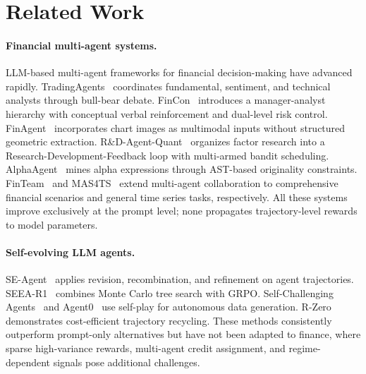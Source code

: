 \section{Related Work}
\label{sec:related}

\paragraph{Financial multi-agent systems.}
LLM-based multi-agent frameworks for financial decision-making have advanced rapidly. TradingAgents~\cite{tradingagents2025} coordinates fundamental, sentiment, and technical analysts through bull-bear debate. FinCon~\cite{fincon2024} introduces a manager-analyst hierarchy with conceptual verbal reinforcement and dual-level risk control. FinAgent~\cite{finagent2024} incorporates chart images as multimodal inputs without structured geometric extraction. R\&D-Agent-Quant~\cite{rdagent2025} organizes factor research into a Research-Development-Feedback loop with multi-armed bandit scheduling. AlphaAgent~\cite{alphaagent2025} mines alpha expressions through AST-based originality constraints. FinTeam~\cite{finteam2025} and MAS4TS~\cite{mas4ts2025} extend multi-agent collaboration to comprehensive financial scenarios and general time series tasks, respectively. All these systems improve exclusively at the prompt level; none propagates trajectory-level rewards to model parameters.

\paragraph{Self-evolving LLM agents.}
SE-Agent~\cite{seagent2025} applies revision, recombination, and refinement on agent trajectories. SEEA-R1~\cite{seea2025} combines Monte Carlo tree search with GRPO. Self-Challenging Agents~\cite{selfchallenge2025} and Agent0~\cite{agent02026} use self-play for autonomous data generation. R-Zero~\cite{rzero2026} demonstrates cost-efficient trajectory recycling. These methods consistently outperform prompt-only alternatives but have not been adapted to finance, where sparse high-variance rewards, multi-agent credit assignment, and regime-dependent signals pose additional challenges.

